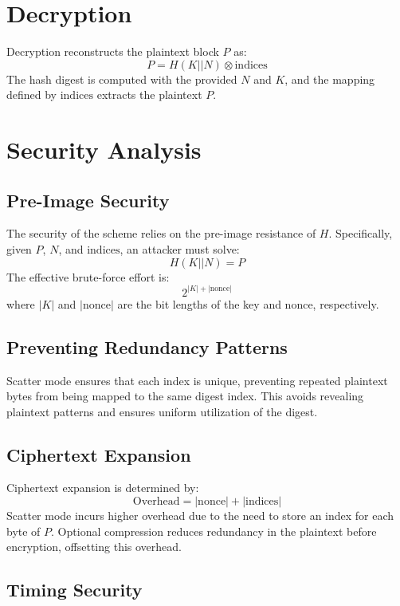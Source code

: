 \documentclass[11pt,a4paper]{article}
\begin{document}
\section*{Decryption}

Decryption reconstructs the plaintext block \( P \) as:
\[
P = H(K || N) \otimes \text{indices}
\]
The hash digest is computed with the provided \( N \) and \( K \), and the mapping defined by \( \text{indices} \) extracts the plaintext \( P \).

\section*{Security Analysis}

\subsection*{Pre-Image Security}

The security of the scheme relies on the pre-image resistance of \( H \). Specifically, given \( P \), \( N \), and \( \text{indices} \), an attacker must solve:
\[
H(K || N) = P
\]
The effective brute-force effort is:
\[
2^{|K| + |\text{nonce}|}
\]
where \( |K| \) and \( |\text{nonce}| \) are the bit lengths of the key and nonce, respectively. 

\subsection*{Preventing Redundancy Patterns}

Scatter mode ensures that each index is unique, preventing repeated plaintext bytes from being mapped to the same digest index. This avoids revealing plaintext patterns and ensures uniform utilization of the digest.

\subsection*{Ciphertext Expansion}

Ciphertext expansion is determined by:
\[
\text{Overhead} = |\text{nonce}| + |\text{indices}|
\]
Scatter mode incurs higher overhead due to the need to store an index for each byte of \( P \). Optional compression reduces redundancy in the plaintext before encryption, offsetting this overhead.

\subsection*{Timing Security}
\end{document}
